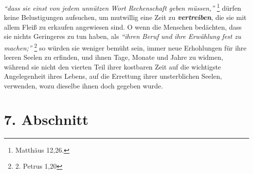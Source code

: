 \textit{"`dass sie einst von jedem unnützen Wort Rechenschaft geben
müssen,"'}
\footnote{Matthäus 12,26.}
dürfen keine Belustigungen aufsuchen, um
mutwillig eine Zeit zu \textbf{\textit{vertreiben}}, die sie mit allem Fleiß zu erkaufen
angewiesen sind. O wenn die Menschen bedächten, dass sie nichts Geringeres zu
tun haben, als
\textit{"`ihren Beruf und ihre Erwählung fest zu machen;"'}
\footnote{2. Petrus 1,20}
so würden sie weniger bemüht sein, immer neue Erhohlungen für ihre
leeren Seelen zu erfinden, und ihnen Tage, Monate und Jahre zu widmen, während
sie nicht den vierten Teil ihrer kostbaren Zeit auf die wichtigste
Angelegenheit ihres Lebens, auf die Errettung ihrer unsterblichen Seelen,
verwenden, wozu dieselbe ihnen doch gegeben wurde.

\section{7. Abschnitt} \label{kap15_ab7}

